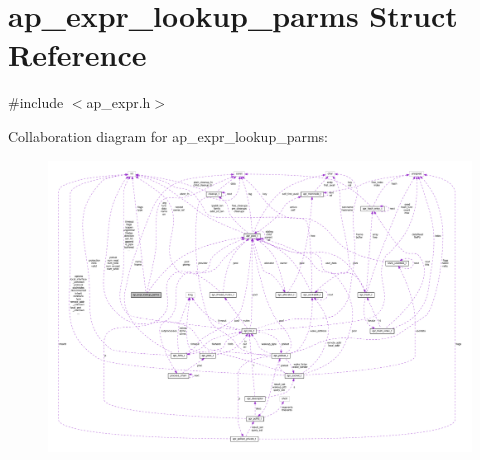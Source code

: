 \hypertarget{structap__expr__lookup__parms}{}\section{ap\+\_\+expr\+\_\+lookup\+\_\+parms Struct Reference}
\label{structap__expr__lookup__parms}


{\ttfamily \#include $<$ap\+\_\+expr.\+h$>$}



Collaboration diagram for ap\+\_\+expr\+\_\+lookup\+\_\+parms\+:
\nopagebreak
\begin{figure}[H]
\begin{center}
\leavevmode
\includegraphics[width=350pt]{structap__expr__lookup__parms__coll__graph}
\end{center}
\end{figure}
